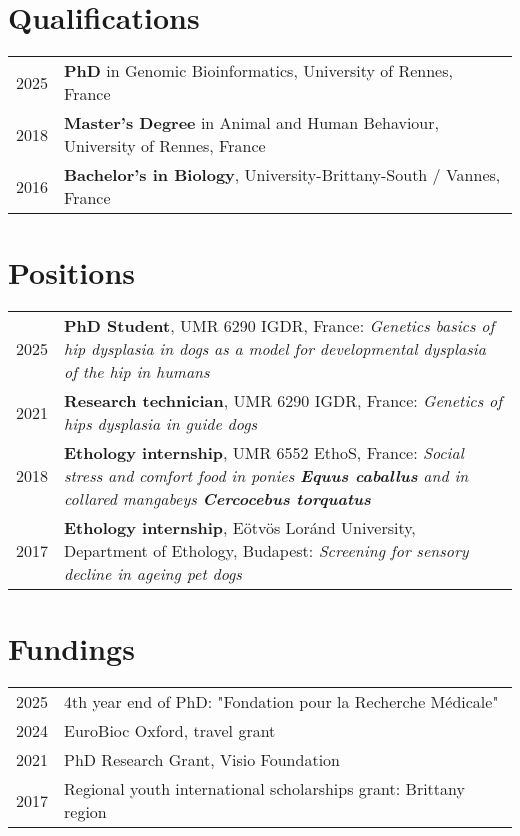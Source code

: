 \documentclass[11pt,a4paper]{moderncv}
\begin{document}
\makecvtitle

\section{Qualifications}
\begin{tabularx}{\textwidth}{p{} X}
    2025 & \textbf{PhD} in Genomic Bioinformatics, University of Rennes, France \\
    2018 & \textbf{Master's Degree} in Animal and Human Behaviour, University of Rennes, France \\
    2016 & \textbf{Bachelor's in Biology}, University-Brittany-South / Vannes, France \\
\end{tabularx}

\section{Positions}
\begin{tabularx}{\textwidth}{p{} X}
    2025 & \textbf{PhD Student}, UMR 6290 IGDR, France: \textit{Genetics basics of hip dysplasia in dogs as a model for developmental dysplasia of the hip in humans} \\
    2021 & \textbf{Research technician}, UMR 6290 IGDR, France: \textit{Genetics of hips dysplasia in guide dogs} \\
    2018 & \textbf{Ethology internship}, UMR 6552 EthoS, France: \textit{Social stress and comfort food in ponies \textbf{Equus caballus} and in collared mangabeys \textbf{Cercocebus torquatus}} \\
    2017 & \textbf{Ethology internship}, Eötvös Loránd University, Department of Ethology, Budapest: \textit{Screening for sensory decline in ageing pet dogs} \\    
\end{tabularx}

\section{Fundings}
\begin{tabularx}{\textwidth}{p{} X}
    2025 & 4th year end of PhD: "Fondation pour la Recherche Médicale" \\
    2024 & EuroBioc Oxford, travel grant \\
    2021 & PhD Research Grant, Visio Foundation \\
    2017 & Regional youth international scholarships grant: Brittany region \\
\end{tabularx}
\end{document}

